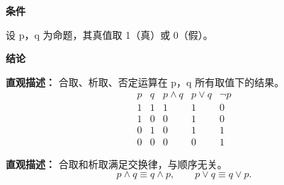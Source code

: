 \begin{statementbox}
	\textbf{\textcolor{CStatement}{条件}}
	\begin{description}[style=nextline, leftmargin=2.8em, labelsep=0.5em, itemsep=0.35em]
		\item[\textbf{\textcolor{CStatement}{条件 1（命题定义）：}}] 设 p，q 为命题，其真值取 1（真）或 0（假）。
	\end{description}

	\textbf{\textcolor{CStatement}{结论}}
	\begin{description}[style=nextline, leftmargin=2.8em, labelsep=0.5em, itemsep=0.45em]
		\item[\textbf{\textcolor{CStatement}{结论一（真值表定义）：}}]
			\textbf{\textcolor{CStatement}{直观描述：}}
			合取、析取、否定运算在 p，q 所有取值下的结果。
			\[
				\begin{array}{cc|c|c|c}
					p & q & p\land q & p\lor q & \lnot p \\ \hline
					1 & 1 & 1 & 1 & 0 \\
					1 & 0 & 0 & 1 & 0 \\
					0 & 1 & 0 & 1 & 1 \\
					0 & 0 & 0 & 0 & 1
			\end{array}
			\]

		\item[\textbf{\textcolor{CStatement}{推广结论（运算交换律）：}}]
			\textbf{\textcolor{CStatement}{直观描述：}}
			合取和析取满足交换律，与顺序无关。
			\[
				p\land q \equiv q\land p,
				\qquad
				p\lor q \equiv q\lor p.
			\]
	\end{description}
\end{statementbox}
